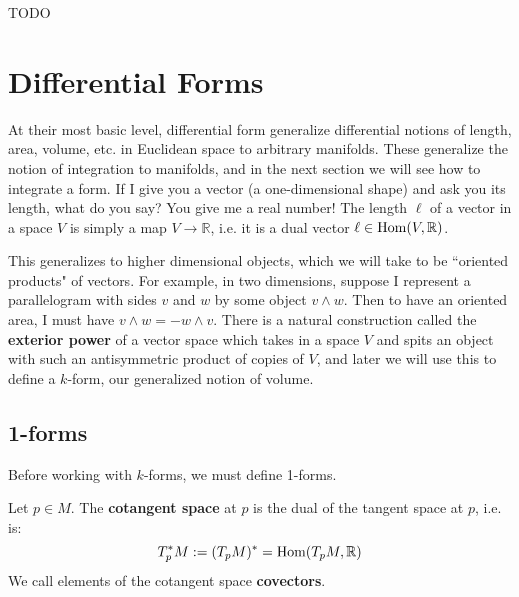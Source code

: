 {\color{red}TODO}

\newpage
\section{Differential Forms}

At their most basic level, differential form generalize differential notions of length, area, volume, etc. in Euclidean space to 
arbitrary manifolds. These generalize the notion of integration to manifolds, and in the next section we will see how to integrate 
a form. If I give you a vector (a one-dimensional shape) and ask you its length, what do you say? You give me a real number! 
The length $\ell$ of a vector in a space $V$ is simply a map $V\rightarrow\mathbb R$, i.e. it is a dual vector $\ell\in \mathrm{Hom}(V, 
\mathbb R)$. 

This generalizes to higher dimensional objects, which we will take to be ``oriented products" of vectors. 
For example, in two dimensions, suppose I represent a parallelogram with sides $v$ and $w$ by some object $v\wedge w$. 
Then to have an oriented area, I must have $v\wedge w = -w\wedge v$. There is a natural construction called the 
\textbf{exterior power} of a vector space which takes in a space $V$ and spits an object with such an antisymmetric product 
of copies of $V$, and later we will use this to define a $k$-form, our generalized notion of volume. 

\subsection{1-forms}

Before working with $k$-forms, we must define 1-forms. 
\begin{definition}
	Let $p\in M$. The \textbf{cotangent space} at $p$ is the dual of the tangent space at $p$, i.e. is:
	\begin{equation}
		T_p^* M := (T_p M)^* = \mathrm{Hom}(T_p M, \mathbb R)
	\end{equation}
	We call elements of the cotangent space \textbf{covectors}.
\end{definition}

